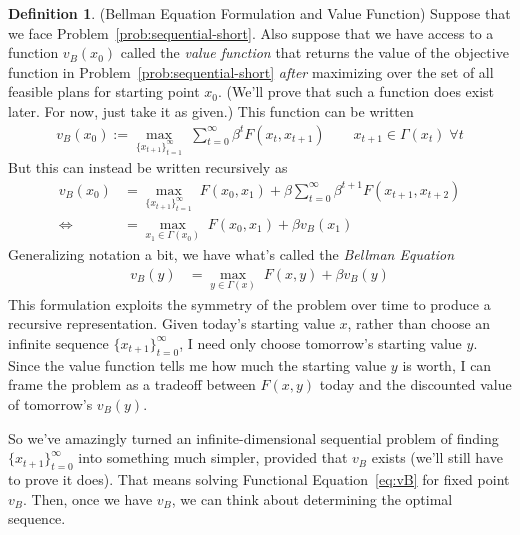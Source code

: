 \documentclass[12pt]{article}
\numberwithin{equation}{section} %
\theoremstyle{plain}
\theoremstyle{definition}
\newtheorem{defn}[thm]{Definition}
\theoremstyle{remark}
\newcommand{\sumtinfz}{\sum^\infty_{t=0}}
\begin{document}
\begin{defn}{(Bellman Equation Formulation and Value Function)}
\label{defn:bellman}
Suppose that we face Problem~\ref{prob:sequential-short}.  Also suppose
that we have access to a function $v_B(x_0)$ called the \emph{value
function} that returns the value of the objective function in
Problem~\ref{prob:sequential-short} \emph{after} maximizing over the set
of all feasible plans for starting point $x_0$. (We'll prove that such a
function does exist later. For now, just take it as given.) This
function can be written
\begin{align*}
  v_B(x_0) :=
  \max_{\{x_{t+1}\}^\infty_{t=1}}\;
  \sumtinfz \beta^t F(x_t,x_{t+1})
  \qquad x_{t+1}\in\Gamma(x_t)\;\forall t
\end{align*}
But this can instead be written recursively as
\begin{align*}
  v_B(x_0)
  &=
  \max_{\{x_{t+1}\}^\infty_{t=1}}\;
  F(x_0,x_1) +
  \beta \sum^\infty_{t=0} \beta^{t+1} F(x_{t+1},x_{t+2})\\
  \Leftrightarrow\qquad
  &=
  \max_{x_1\in\Gamma(x_0)}\;
  F(x_0,x_1) +
  \beta v_B(x_1)
\end{align*}
Generalizing notation a bit, we have what's called the \emph{Bellman
Equation}
\begin{align}
  \label{eq:vB}
  v_B(y) &=
  \max_{y\in\Gamma(x)}\;
  F(x,y) +
  \beta v_B(y)
\end{align}
This formulation exploits the symmetry of the problem over time to
produce a recursive representation.  Given today's starting value $x$,
rather than choose an infinite sequence $\{x_{t+1}\}_{t=0}^\infty$, I
need only choose tomorrow's starting value $y$.  Since the value
function tells me how much the starting value $y$ is worth, I can frame
the problem as a tradeoff between $F(x,y)$ today and the discounted
value of tomorrow's $v_B(y)$.

So we've amazingly turned an infinite-dimensional sequential problem of
finding $\{x_{t+1}\}^\infty_{t=0}$ into something much simpler, provided
that $v_B$ exists (we'll still have to prove it does).  That means
solving Functional Equation~\ref{eq:vB} for fixed point $v_B$. Then,
once we have $v_B$, we can think about determining the optimal sequence.
\end{defn}
\end{document}
